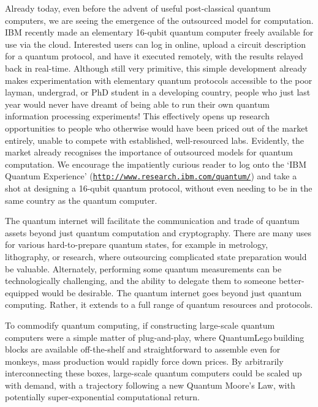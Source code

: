 \documentclass[aps, rmp, twocolumn, amsmath, amssymb, nofootinbib, superscriptaddress, longbibliography, floatfix, table-of-contents, eqsecnum]{revtex4-1}
\begin{document}
Already today, even before the advent of useful post-classical quantum computers, we are seeing the emergence of the outsourced model for computation. IBM recently made an elementary 16-qubit quantum computer freely available for use via the cloud. Interested users can log in online, upload a circuit description for a quantum protocol, and have it executed remotely, with the results relayed back in real-time. Although still very primitive, this simple development already makes experimentation with elementary quantum protocols accessible to the poor layman, undergrad, or PhD student in a developing country, people who just last year would never have dreamt of being able to run their own quantum information processing experiments! This effectively opens up research opportunities to people who otherwise would have been priced out of the market entirely, unable to compete with established, well-resourced labs. Evidently, the market already recognises the importance of outsourced models for quantum computation. We encourage the impatiently curious reader to log onto the `IBM Quantum Experience' (\texttt{\href{http://www.research.ibm.com/quantum/}{http://www.research.ibm.com/quantum/}}) and take a shot at designing a 16-qubit quantum protocol, without even needing to be in the same country as the quantum computer.

The quantum internet will facilitate the communication and trade of quantum assets beyond just quantum computation and cryptography. There are many uses for various hard-to-prepare quantum states, for example in metrology, lithography, or research, where outsourcing complicated state preparation would be valuable. Alternately, performing some quantum measurements can be technologically challenging, and the ability to delegate them to someone better-equipped would be desirable. The quantum internet goes beyond just quantum computing. Rather, it extends to a full range of quantum resources and protocols. 

To commodify quantum computing, if constructing large-scale quantum computers were a simple matter of plug-and-play, where QuantumLego\texttrademark \,building blocks are available off-the-shelf and straightforward to assemble even for monkeys, mass production would rapidly force down prices. By arbitrarily interconnecting these boxes, large-scale quantum computers could be scaled up with demand, with a trajectory following a new Quantum Moore's Law, with potentially super-exponential computational return.
\end{document}
